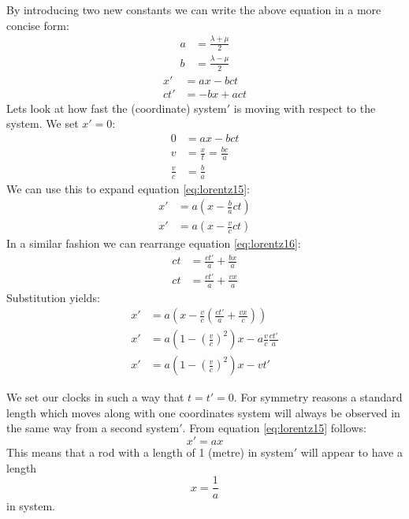 \documentclass[12pt,a4paper]{article}
\numberwithin{equation}{section}
\numberwithin{figure}{section}
\numberwithin{table}{section}
\begin{document}
By introducing two new constants we can write the above equation in a more concise form:
\begin{align}\label{eq:lorentz1314}
a &= \frac{\lambda + \mu}{2} \\
b &= \frac{\lambda - \mu}{2}
\end{align}
\begin{align} \label{eq:lorentz15}
x' &= ax - bct \\ 
ct'&= -bx +act \label{eq:lorentz16}
\end{align}
Lets look at how fast the (coordinate) system$'$ is moving with respect to the system. We set $x'=0$:
\begin{align}\label{eq:lorentz171819}
0 &= ax - bct \\
v &= \frac{x}{t} = \frac{bc}{a} \\ 
\frac{v}{c} &= \frac{b}{a}\label{eq:lorentz19}
\end{align}
We can use this to expand equation \ref{eq:lorentz15}:
\begin{align}\label{eq:lorentz2021}
x' &= a\left( x -\frac{b}{a}ct\right)   \\
x' &= a\left( x -\frac{v}{c}ct\right) 
\end{align}
In a similar fashion we can rearrange equation \ref{eq:lorentz16}:
\begin{align}\label{eq:lorentz2223}
ct &= \frac{ct'}{a}+\frac{bx}{a}  \\
ct &= \frac{ct'}{a}+\frac{vx}{a}
\end{align}
Substitution yields:
\begin{align}\label{eq:lorentz24}
x' &= a\left( x-\frac{v}{c}\left( \frac{ct'}{a}+\frac{vx}{c}\right) \right) \\
x' &= a\left( 1-\left( \frac{v}{c}\right) ^2\right) x-a \frac{v}{c}\frac{ct'}{a}\\
x' &= a\left( 1-\left( \frac{v}{c}\right) ^2\right) x-vt' \label{eq:lorentz26}
\end{align}

We set our clocks in such a way that $t=t'=0$. For symmetry reasons a standard length which moves along with one coordinates system will always be observed in the same way from a second system$'$. From equation \ref{eq:lorentz15} follows:
\begin{equation}\label{eq:lorentz27}
x'=ax
\end{equation}
This means that a rod with a length of 1 (metre) in system$'$ will appear to have a length
\begin{equation}\label{eq:lorentz28}
x=\frac{1}{a}
\end{equation}
in system.
\end{document}
